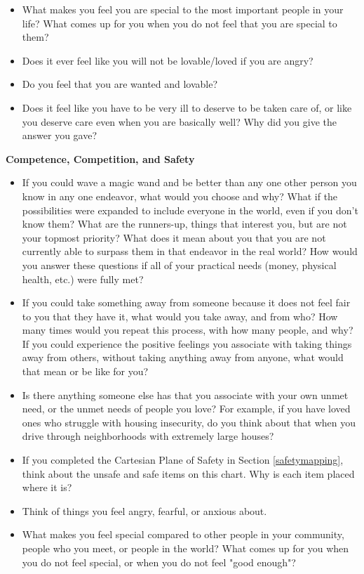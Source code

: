 \documentclass[12pt,letterpaper]{book}
\begin{document}
\begin{itemize}
    \item What makes you feel you are special to the most important people in your life? What comes up for you when you do not feel that you are special to them?
    \item Does it ever feel like you will not be lovable/loved if you are angry?
    \item Do you feel that you are wanted and lovable?
    \item Does it feel like you have to be very ill to deserve to be taken care of, or like you deserve care even when you are basically well?  Why did you give the answer you gave?
\end{itemize}

\noindent \textbf{Competence, Competition, and Safety}
\begin{itemize}
    \item If you could wave a magic wand and be better than any one other person you know in any one endeavor, what would you choose and why? What if the possibilities were expanded to include everyone in the world, even if you don't know them? What are the runners-up, things that interest you, but are not your topmost priority? What does it mean about you that you are not currently able to surpass them in that endeavor in the real world? How would you answer these questions if all of your practical needs (money, physical health, etc.) were fully met?
    \item If you could take something away from someone because it does not feel fair to you that they have it, what would you take away, and from who? How many times would you repeat this process, with how many people, and why? If you could experience the positive feelings you associate with taking things away from others, without taking anything away from anyone, what would that mean or be like for you?
    \item Is there anything someone else has that you associate with your own unmet need, or the unmet needs of people you love? For example, if you have loved ones who struggle with housing insecurity, do you think about that when you drive through neighborhoods with extremely large houses?
    \item If you completed the Cartesian Plane of Safety in Section \ref{safetymapping}, think about the unsafe and safe items on this chart. Why is each item placed where it is?
    \item Think of things you feel angry, fearful, or anxious about. 
    \item What makes you feel special compared to other people in your community, people who you meet, or people in the world? What comes up for you when you do not feel special, or when you do not feel "good enough"?

\end{itemize}
\end{document}

